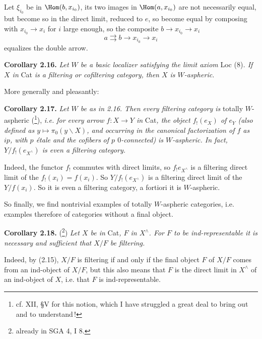 
Let $\xi_{i_0}$ be in $\Hom(b,x_{i_0})$, its two images in $\Hom(a,x_{i_0})$ are not necessarily equal, but become so in the direct limit, reduced to $e$, so become equal by composing with $x_{i_0} \longrightarrow x_i$ for $i$ large enough, so the composite $b \longrightarrow x_{i_0} \longrightarrow x_i$
\[
a \rightrightarrows b \longrightarrow x_{i_0} \longrightarrow x_i
\]
equalizes the double arrow.

\noindent\textbf{Corollary 2.16.} \textit{Let $W$ be a basic localizer satisfying the limit axiom} Loc (8)\textit{. If $X$ in} Cat \textit{is a filtering or cofiltering category, then $X$ is $W$-aspheric.}

More generally and pleasantly:

\noindent\textbf{Corollary 2.17.} \textit{Let $W$ be as in 2.16. Then every filtering category is} totally $W$-aspheric (\footnote[40]{cf. XII, §V for this notion, which I have struggled a great deal to bring out and to understand\,!}), \textit{i.e. for every arrow $f : X \longrightarrow Y$ in} Cat\textit{, the object $f_!(e_X)$ of $e_Y$ (also defined as $y \longmapsto \pi_0(y\backslash X)$, and occurring in the canonical factorization of $f$ as $ip$, with $p$ étale and the cofibers} \textit{of $p$ $0$-connected)}  \textit{is $W$-aspheric. In fact, $Y/f_!(e_{X^\wedge})$ is even a filtering category.}

Indeed, the functor $f_!$ commutes with direct limits, so $f_! e_{X^\wedge}$ is a filtering direct limit of the $f_!(x_i) = f(x_i)$. So $Y/f_!(e_{X^\wedge})$ is a filtering direct limit of the $Y/f(x_i)$. So it is even a filtering category, a fortiori it is $W$-aspheric.

So finally, we find nontrivial examples of totally $W$-aspheric categories, i.e. examples therefore of categories without a final object. %

\noindent\textbf{Corollary 2.18.} (\footnote[41]{already in SGA 4, I 8.}) \textit{Let $X$ be in} Cat\textit{, $F$ in $X^\wedge$. For $F$ to be ind-representable it is necessary and sufficient that $X/F$ be filtering.}

Indeed, by (2.15), $X/F$ is filtering if and only if the final object $F$ of $X/F$ comes from an ind-object of $X/F$, but this also means that $F$ is the direct limit in $X^\wedge$ of an ind-object of $X$, i.e. that $F$ is ind-representable.

